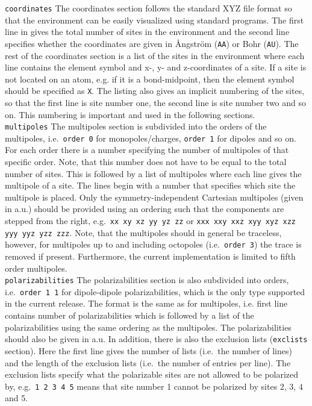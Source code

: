 \noindent\texttt{coordinates}\newline
The coordinates section follows the standard XYZ file format so that the 
environment can be easily visualized using standard programs. The first line in 
gives the total number of sites in the environment and the second line 
specifies whether the coordinates are given in \AA{}ngstr\"{o}m (\verb|AA|) or 
Bohr (\verb|AU|). The rest of the coordinates section is a list of the sites in 
the environment where each line contains the element symbol and x-, y- and 
z-coordinates of a site. If a site is not located on an atom, e.g. if it is a 
bond-midpoint, then the element symbol should be specified as \verb|X|. The 
listing also gives an implicit numbering of the sites, so that the first line 
is site number one, the second line is site number two and so on. This 
numbering is important and used in the following sections.\\

\noindent\texttt{multipoles}\newline
The multipoles section is subdivided into the orders of the multipoles, i.e.\ 
\verb|order 0| for monopoles/charges, \verb|order 1| for dipoles and so on. 
For each order there is a number specifying the number of multipoles of that 
specific order. Note, that this number does not have to be equal to the total 
number of sites. This is followed by a list of multipoles where each line 
gives the multipole of a site. The lines begin with a number that specifies 
which site the multipole is placed. Only the symmetry-independent Cartesian 
multipoles (given in a.u.) should be provided using an ordering such that the components are stepped from the right, e.g.\ \verb|xx xy xz yy yz zz| or 
\verb|xxx xxy xxz xyy xyz xzz yyy yyz yzz zzz|. Note, that the multipoles
should in general be traceless, however, for multipoles up to and including
octopoles (i.e.\ \verb|order 3|) the trace is removed if present. Furthermore,
the current implementation is limited to fifth order multipoles.\\

\noindent\texttt{polarizabilities}\newline
The polarizabilities section is also subdivided into orders,
i.e.\ \verb|order 1 1| for dipole-dipole polarizabilities, which is the only 
type supported in the current release. The format is the same as for 
multipoles, i.e. first line contains number of polarizabilities which is 
followed by a list of the polarizabilities using the same ordering as the 
multipoles. The polarizabilities should also be given in a.u. In addition, 
there is also the exclusion lists (\verb|exclists| 
section). Here the first line gives the number of lists (i.e.\ the number of 
lines) and the length of the exclusion lists (i.e.\ the number of entries per 
line). The exclusion lists specify what the polarizable sites are not allowed 
to be polarized by, e.g.\ \verb|1 2 3 4 5| means that site number 1 cannot be 
polarized by sites 2, 3, 4 and 5.


